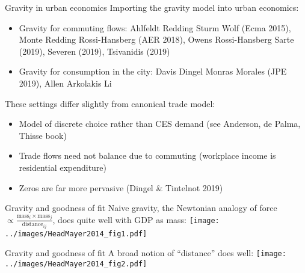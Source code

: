 \documentclass[10pt,notes=hide]{beamer}
\begin{document}
\begin{frame}{Gravity in urban economics}
Importing the gravity model into urban economics:
\begin{itemize}
	\item Gravity for commuting flows: 
	Ahlfeldt Redding Sturm Wolf (Ecma 2015), Monte Redding Rossi-Hansberg (AER 2018), Owens Rossi-Hansberg Sarte (2019), Severen (2019), Tsivanidis (2019)
	\item Gravity for consumption in the city:
	Davis Dingel Monras Morales (JPE 2019), Allen Arkolakis Li
\end{itemize}
These settings differ slightly from canonical trade model: 
\begin{itemize}
	\item Model of discrete choice rather than CES demand (see Anderson, de Palma, Thisse book)
	\item Trade flows need not balance due to commuting (workplace income is residential expenditure)
	\item Zeros are far more pervasive (Dingel \& Tintelnot 2019)
\end{itemize}
\end{frame}
\begin{frame}{Gravity and goodness of fit}
Naive gravity,
the Newtonian analogy of force $\propto \frac{\text{mass}_i \times \text{mass}_j}{\text{distance}_{ij}}$,
does quite well with GDP as mass:
\texttt{[image: ../images/HeadMayer2014\_fig1.pdf]}
\end{frame}
\begin{frame}{Gravity and goodness of fit}
A broad notion of ``distance'' does well:
\texttt{[image: ../images/HeadMayer2014\_fig2.pdf]}
\end{frame}
\end{document}
